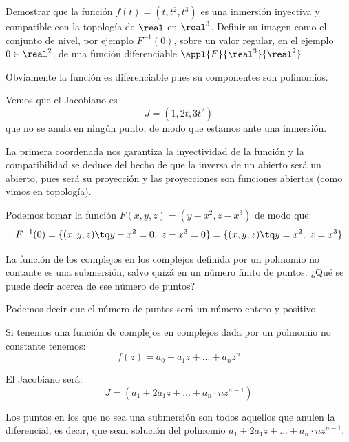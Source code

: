 \begin{problem}[5]
Demostrar que la función $f(t)=(t,t^2,t^3)$ es una inmersión inyectiva y compatible con la topología de $\real$ en $\real^3$. Definir su imagen como el conjunto de nivel, por ejemplo $F^{-1}(0)$, sobre un valor regular, en el ejemplo $0 \in \real^2$, de una función diferenciable $\appl{F}{\real^3}{\real^2}$
\solution



Obviamente la función es diferenciable pues su componentes son polinomios.

Vemos que el Jacobiano es
\[J=(1,2t,3t^2)\]
que no se anula en ningún punto, de modo que estamos ante una inmersión.

La primera coordenada nos garantiza la inyectividad de la función y la compatibilidad se deduce del hecho de que la inversa de un abierto será un abierto, pues será su proyección y las proyecciones son funciones abiertas (como vimos en topología).

Podemos tomar la función $F(x,y,z)=(y-x^2, z-x^3)$ de modo que:
\[F^{-1}(0)=\{(x,y,z) \tq y-x^2 = 0, \ z-x^3=0\} = \{(x,y,z) \tq y=x^2, \ z= x^3\}\]
\end{problem}

\begin{problem}[6]
La función de los complejos en los complejos definida por un polinomio no contante es una submersión, salvo quizá en un número finito de puntos. ¿Qué se puede decir acerca de ese número de puntos?
\solution


Podemos decir que el número de puntos será un número entero y positivo.

Si tenemos una función de complejos en complejos dada por un polinomio no constante tenemos:
\[f(z)=a_0+a_1z+...+a_nz^n\]

El Jacobiano será:
\[J=(a_1+2a_1z+...+a_n\cdot n z^{n-1})\]

Los puntos en los que no sea una submersión son todos aquellos que anulen la diferencial, es decir, que sean solución del polinomio $a_1+2a_1z+...+a_n\cdot n z^{n-1}$.

\end{problem}

